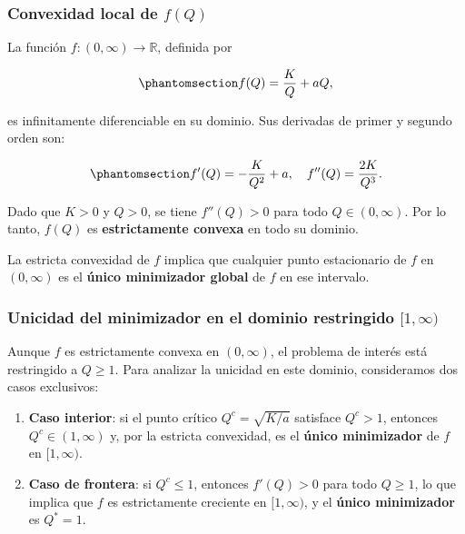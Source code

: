 \documentclass[
  spanish,
  us-letterpaper,
  DIV=11,
  numbers=noendperiod]{scrreprt}
\numberwithin{equation}{section}
\begin{document}
\subsubsection{\texorpdfstring{Convexidad local de
\(f(Q)\)}{Convexidad local de f(Q)}}\label{convexidad-local-de-fq}

La función \(f : (0, \infty) \to \mathbb{R}\), definida por

\begin{equation}\phantomsection\label{eq-fQ_25_3}{
f(Q) = \frac{K}{Q} + a Q,
}\end{equation}

es infinitamente diferenciable en su dominio. Sus derivadas de primer y
segundo orden son:

\begin{equation}\phantomsection\label{eq-fpp_25_3}{
f'(Q) = -\frac{K}{Q^2} + a,
\quad
f''(Q) = \frac{2K}{Q^3}.
}\end{equation}

Dado que \(K > 0\) y \(Q > 0\), se tiene \(f''(Q) > 0\) para todo
\(Q \in (0, \infty)\). Por lo tanto, \(f(Q)\) es \textbf{estrictamente
convexa} en todo su dominio.

La estricta convexidad de \(f\) implica que cualquier punto estacionario
de \(f\) en \((0, \infty)\) es el \textbf{único minimizador global} de
\(f\) en ese intervalo.

\subsubsection{\texorpdfstring{Unicidad del minimizador en el dominio
restringido
\([1, \infty)\)}{Unicidad del minimizador en el dominio restringido {[}1, \textbackslash infty)}}\label{unicidad-del-minimizador-en-el-dominio-restringido-1-infty}

Aunque \(f\) es estrictamente convexa en \((0, \infty)\), el problema de
interés está restringido a \(Q \geq 1\). Para analizar la unicidad en
este dominio, consideramos dos casos exclusivos:

\begin{enumerate}
\def\labelenumi{\arabic{enumi}.}
\item
  \textbf{Caso interior}: si el punto crítico \(Q^c = \sqrt{K/a}\)
  satisface \(Q^c > 1\), entonces \(Q^c \in (1, \infty)\) y, por la
  estricta convexidad, es el \textbf{único minimizador} de \(f\) en
  \([1, \infty)\).
\item
  \textbf{Caso de frontera}: si \(Q^c \leq 1\), entonces \(f'(Q) > 0\)
  para todo \(Q \geq 1\), lo que implica que \(f\) es estrictamente
  creciente en \([1, \infty)\), y el \textbf{único minimizador} es
  \(Q^* = 1\).
\end{enumerate}
\end{document}
